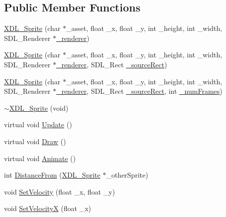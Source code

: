 \subsection*{Public Member Functions}
\begin{DoxyCompactItemize}
\item 
\hyperlink{class_x_d_l___sprite_a08dc933c20ca8108d845707f9e398d10}{X\-D\-L\-\_\-\-Sprite} (char $\ast$\-\_\-asset, float \-\_\-x, float \-\_\-y, int \-\_\-height, int \-\_\-width, S\-D\-L\-\_\-\-Renderer $\ast$\hyperlink{class_x_d_l___sprite_aedcf07ef73df095eb6cd9843870cd002}{\-\_\-renderer})
\item 
\hyperlink{class_x_d_l___sprite_ab60f32a7fe998097e6d02aa7c847b749}{X\-D\-L\-\_\-\-Sprite} (char $\ast$\-\_\-asset, float \-\_\-x, float \-\_\-y, int \-\_\-height, int \-\_\-width, S\-D\-L\-\_\-\-Renderer $\ast$\hyperlink{class_x_d_l___sprite_aedcf07ef73df095eb6cd9843870cd002}{\-\_\-renderer}, S\-D\-L\-\_\-\-Rect \hyperlink{class_x_d_l___sprite_a98c75cc4f4abc07331ad8de391a19675}{\-\_\-source\-Rect})
\item 
\hyperlink{class_x_d_l___sprite_abb51264da3395288eaaedf3959380b6d}{X\-D\-L\-\_\-\-Sprite} (char $\ast$\-\_\-asset, float \-\_\-x, float \-\_\-y, int \-\_\-height, int \-\_\-width, S\-D\-L\-\_\-\-Renderer $\ast$\hyperlink{class_x_d_l___sprite_aedcf07ef73df095eb6cd9843870cd002}{\-\_\-renderer}, S\-D\-L\-\_\-\-Rect \hyperlink{class_x_d_l___sprite_a98c75cc4f4abc07331ad8de391a19675}{\-\_\-source\-Rect}, int \hyperlink{class_x_d_l___sprite_a64b44e17128d166f81a5ad0a3f1f0130}{\-\_\-num\-Frames})
\item 
\hyperlink{class_x_d_l___sprite_a2d947763ed4e7f0456c4b71b7469878d}{$\sim$\-X\-D\-L\-\_\-\-Sprite} (void)
\item 
virtual void \hyperlink{class_x_d_l___sprite_a1ecd6d713ce320cd1d49dceea854e0d2}{Update} ()
\item 
virtual void \hyperlink{class_x_d_l___sprite_a5b1c9b886c59f06cfbb2c428b3f58e86}{Draw} ()
\item 
virtual void \hyperlink{class_x_d_l___sprite_af594d7e5987b56ea146e640b9ced33b2}{Animate} ()
\item 
int \hyperlink{class_x_d_l___sprite_afdb08b31975b535f79552d9072c733a2}{Distance\-From} (\hyperlink{class_x_d_l___sprite}{X\-D\-L\-\_\-\-Sprite} $\ast$\-\_\-other\-Sprite)
\item 
void \hyperlink{class_x_d_l___sprite_a86e71ad05873cf708fbf145059ef2887}{Set\-Velocity} (float \-\_\-x, float \-\_\-y)
\item 
void \hyperlink{class_x_d_l___sprite_a85d1fae8e92ac494f1a6ec01e29c8c3f}{Set\-Velocity\-X} (float \-\_\-x)

\end{DoxyCompactItemize}
